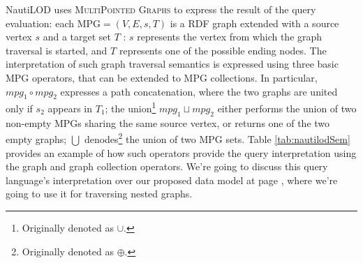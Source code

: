 
NautiLOD uses \textsc{MultiPointed Graphs} to express the result of the query evaluation: each MPG$=(V,E,s,T)$ is a RDF graph extended with a source vertex $s$ and a target set $T$ : $s$ represents the vertex from which the graph traversal is started, and $T$ represents one of the possible ending nodes. The interpretation of such graph traversal semantics is expressed using three basic MPG operators, that can be extended to MPG collections. In particular,  $mpg_1 \circ mpg_2$ expresses a path concatenation, where the two graphs are united only if $s_2$ appears in $T_1$; the union\footnote{Originally denoted as $\cup$.} $mpg_1 \sqcup mpg_2$ either performs the union of two non-empty MPGs sharing the same source vertex, or returns one of the two empty graphs; $\bigcup$ denodes\footnote{Originally denoted as $\oplus$.} the union of two MPG sets. Table \ref{tab:nautilodSem} provides an example of how such operators provide the query interpretation using the graph and graph collection operators.  We're going to discuss this query language's interpretation over our proposed data model at page \pageref{ph:NTLImpl}, where we're going to use it for traversing nested graphs.
